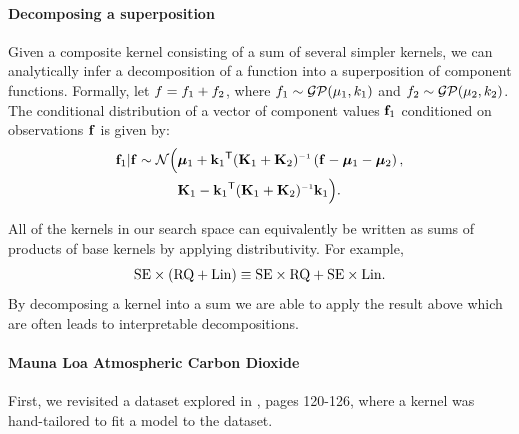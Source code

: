 \documentclass[twoside]{article}
\begin{document}
\paragraph{Decomposing a superposition}
\label{sec:decomposing}
Given a composite kernel consisting of a sum of several simpler kernels, we can analytically infer a decomposition of a function into a superposition of component functions.
Formally,
let $f = f_1 + f_2$, where $f_1 \sim \mathcal{GP}( {\bf{\mu}}_1, k_1)$ and $f_2 \sim \mathcal{GP}( {\bf{\mu}}_2, k_2)$.
The conditional distribution of a vector of component values ${\bf{f}}_1$ conditioned on observations ${\bf{f}}$ is given by:
\begin{align}
\vf_1 | \vf \sim \mathcal{N} \Big( & \boldsymbol\mu_1 + \vk_1\tra (\vK_1 + \vK_2)\inv \left( \vf - \boldsymbol\mu_1 - \boldsymbol\mu_2 \right), \nonumber \\
& \vK_1 - \vk_1\tra (\vK_1 + \vK_2)\inv \vk_1 \Big).
\end{align}

All of the kernels in our search space can equivalently be written as sums of products of base kernels by applying distributivity.
For example,
\[{\textrm{SE} \times (\textrm{RQ} + \textrm{Lin}) \equiv \textrm{SE} \times \textrm{RQ} + \textrm{SE} \times \textrm{Lin}}.\]
By decomposing a kernel into a sum we are able to apply the result above which  are often leads to interpretable decompositions.%

\label{sec:extrapolation}
\paragraph{Mauna Loa Atmospheric Carbon Dioxide}

First, we revisited a dataset explored in \mbox{\cite{rasmussen38gaussian}}, pages 120-126, where a kernel was hand-tailored to fit a \gp{} model to the dataset.
\end{document}
